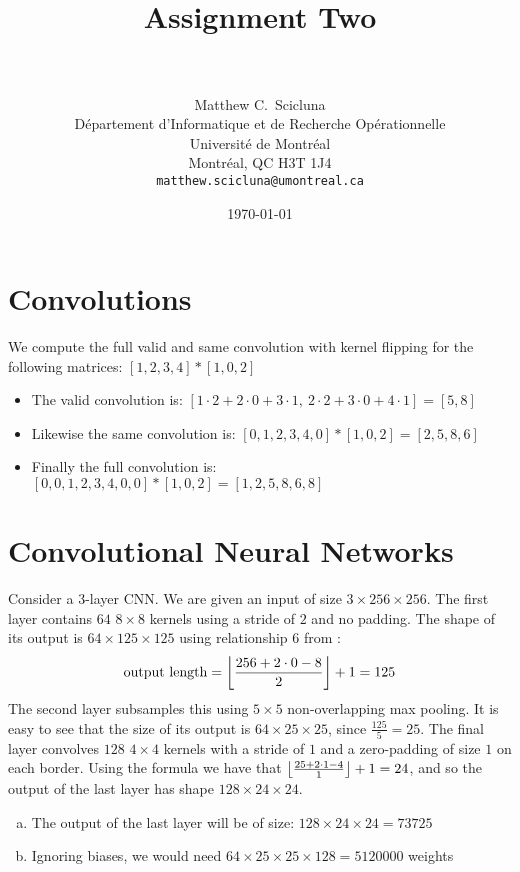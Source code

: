 \documentclass[paper=a4, fontsize=11pt]{scrartcl} %
\title{	
\normalfont \normalsize 
\horrule{0.5pt} \\[0.4cm] %
\huge Assignment Two \\ %
\horrule{2pt} \\[0.5cm] %
}
\author{
	Matthew C.~Scicluna\\
	D\'epartement d'Informatique et de Recherche Op\'erationnelle\\
	Universit\'e de Montr\'eal\\
	Montr\'eal, QC H3T 1J4 \\
	\texttt{matthew.scicluna@umontreal.ca}
}
\date{\normalsize\today} %
\numberwithin{equation}{section} %
\numberwithin{figure}{section} %
\numberwithin{table}{section} %
\DeclarePairedDelimiter\floor{\lfloor}{\rfloor}
\begin{document}
\maketitle %


\section{Convolutions}
We compute the full valid and same convolution with kernel flipping for the following matrices: $[1, 2, 3, 4] * [1, 0, 2]$

\begin{itemize}
	\item The valid convolution is: $[1\cdot2 + 2\cdot0 + 3\cdot1, \ 2\cdot2 + 3\cdot0 + 4\cdot1] = [5,8]$
	\item Likewise the same convolution is: $[0, 1, 2, 3, 4, 0] * [1, 0, 2] = [2,5,8,6]$
	\item Finally the full convolution is: $[0, 0, 1, 2, 3, 4, 0, 0] * [1, 0, 2] = [1,2,5,8,6,8]$
\end{itemize}

\section{Convolutional Neural Networks}
Consider a $3$-layer CNN. We are given an input of size $3\times256\times256$. The first layer contains $64$ $8\times8$ kernels using a stride of $2$ and no padding. The shape of its output is $64\times125\times125$ using relationship 6 from \cite{journals/corr/DumoulinV16}: 
$$\text{output length}=\floor*{\frac{256+2\cdot0-8}{2}}+1=125$$
The second layer subsamples this using $5\times5$ non-overlapping max pooling. It is easy to see that the size of its output is $64\times25\times25$, since $\frac{125}{5}=25$. The final layer convolves $128$ $4\times4$ kernels with a stride of $1$ and a zero-padding of size $1$ on each border. Using the formula we have that $\floor*{\frac{25+2\cdot1-4}{1}}+1=24$, and so the output of the last layer has shape $128\times24\times24$.
\begin{enumerate}[(a)]
	\item The output of the last layer will be of size: $128\times24\times24 = 73725$
	\item Ignoring biases, we would need $64\times25\times25\times128 = 5120000$ weights
\end{enumerate}
\end{document}
